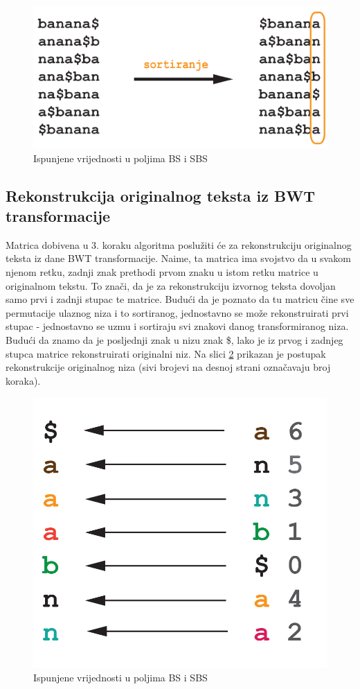 \begin{figure}[H]
\centering
\includegraphics[scale=0.2]{./pictures/bwt.jpg}
\caption{Ispunjene vrijednosti u poljima BS i SBS}\label{bwt1}
\end{figure}

\subsection{Rekonstrukcija originalnog teksta iz BWT transformacije}
Matrica dobivena u 3. koraku algoritma poslužiti će za rekonstrukciju originalnog teksta iz dane BWT transformacije. Naime, ta matrica ima svojstvo da u svakom njenom retku, zadnji znak prethodi prvom znaku u istom retku matrice u originalnom tekstu. To znači, da je za rekonstrukciju izvornog teksta dovoljan samo prvi i zadnji stupac te matrice. Budući da je poznato da tu matricu čine sve permutacije ulaznog niza i to sortiranog, jednostavno se može rekonstruirati prvi stupac - jednostavno se uzmu i sortiraju svi znakovi danog transformiranog niza. Budući da znamo da je posljednji znak u nizu znak \$, lako je iz prvog i zadnjeg stupca matrice rekonstruirati originalni niz. Na slici \ref{bwt2} prikazan je postupak rekonstrukcije originalnog niza (sivi brojevi na desnoj strani označavaju broj koraka).

\begin{figure}[H]
\centering
\includegraphics[scale=0.2]{./pictures/reverseBWT.jpg}
\caption{Ispunjene vrijednosti u poljima BS i SBS}\label{bwt2}
\end{figure}

